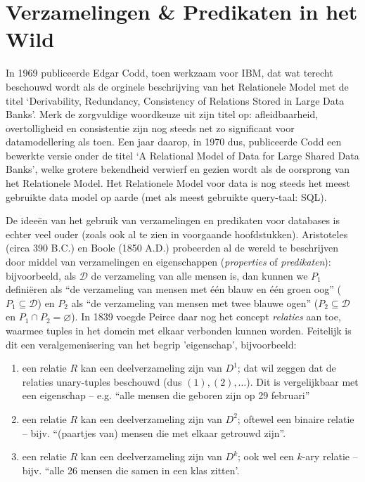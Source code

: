 \chapter{Verzamelingen \& Predikaten in het Wild}
In 1969 publiceerde Edgar Codd, toen werkzaam voor IBM, dat wat terecht beschouwd wordt als de orginele beschrijving van het Relationele Model met de titel `Derivability, Redundancy, Consistency of Relations Stored in Large Data Banks'. Merk de zorgvuldige woordkeuze uit zijn titel op: afleidbaarheid, overtolligheid en consistentie zijn nog steeds net zo significant voor datamodellering als toen. Een jaar daarop, in 1970 dus, publiceerde Codd een bewerkte versie onder de titel `A Relational Model of Data for Large Shared Data Banks', welke grotere bekendheid verwierf en gezien wordt als de oorsprong van het Relationele Model. Het Relationele Model voor data is nog steeds het meest gebruikte data model op aarde (met als meest gebruikte query-taal: SQL).

De idee\"en van het gebruik van verzamelingen en predikaten voor databases is echter veel ouder (zoals ook al te zien in voorgaande hoofdstukken). Aristoteles (circa 390 B.C.) en Boole (1850 A.D.) probeerden al de wereld te beschrijven door middel van verzamelingen en eigenschappen (\textit{properties} of \textit{predikaten}): bijvoorbeeld, als $\mathcal{D}$ de verzameling van alle mensen is, dan kunnen we $P_1$ definiëren als ``de verzameling van mensen met \'e\'en blauw en \'e\'en groen oog'' ($P_1\subseteq\mathcal{D}$) en $P_2$ als ``de verzameling van mensen met twee blauwe ogen'' ($P_2\subseteq\mathcal{D}$ en $P_1\cap P_2=\varnothing$). In 1839 voegde Peirce daar nog het concept \textit{relaties} aan toe, waarmee tuples in het domein met elkaar verbonden kunnen worden. Feitelijk is dit een veralgemenisering van het begrip 'eigenschap', bijvoorbeeld:
\begin{enumerate}
\item een relatie $R$ kan een deelverzameling zijn van $D^1$; dat wil zeggen dat de relaties unary-tuples beschouwd (dus $(1),(2),\ldots$). Dit is vergelijkbaar met een eigenschap -- e.g. ``alle mensen die geboren zijn op 29 februari''
\item een relatie $R$ kan een deelverzameling zijn van $D^2$; oftewel een binaire relatie -- bijv. ``(paartjes van) mensen die met elkaar getrouwd zijn''.
\item een relatie $R$ kan een deelverzameling zijn van $D^k$; ook wel een $k$-ary relatie -- bijv. ``alle 26 mensen die samen in een klas zitten'.
\end{enumerate}

